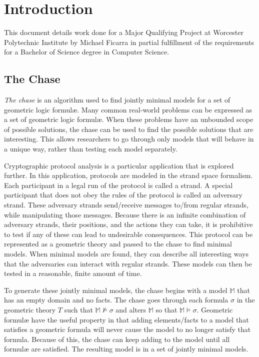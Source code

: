 \section{Introduction}

	This document details work done for a Major Qualifying Project at Worcester
	Polytechnic Institute by Michael Ficarra in partial fulfillment of the
	requirements for a Bachelor of Science degree in Computer Science.

	\subsection{The Chase}

		\emph{The chase} is an algorithm used to find jointly minimal models
		for a set of geometric logic formul{\ae}. Many common real-world
		problems can be expressed as a set of geometric logic formul{\ae}. When
		these problems have an unbounded scope of possible solutions, the chase
		can be used to find the possible solutions that are interesting. This
		allows researchers to go through only models that will behave in a
		unique way, rather than testing each model separately.

		Cryptographic protocol analysis is a particular application that is
		explored further. In this application, protocols are modeled in the
		strand space formalism. Each participant in a legal run of the
		protocol is called a strand. A special participant that does not obey
		the rules of the protocol is called an adversary strand. These
		adversary strands send/receive messages to/from regular strands, while
		manipulating those messages. Because there is an infinite combination
		of adversary strands, their positions, and the actions they can take,
		it is prohibitive to test if any of these can lead to undesirable
		consequences. This protocol can be represented as a geometric theory
		and passed to the chase to find minimal models. When minimal models
		are found, they can describe all interesting ways that the adversaries
		can interact with regular strands. These models can then be tested in
		a reasonable, finite amount of time.

		To generate these jointly minimal models, the chase begins with a model
		$\mathbb{M}$ that has an empty domain and no facts. The chase goes
		through each formula $\sigma$ in the geometric theory $T$ such that
		$\mathbb{M} \not\models \sigma$ and alters $\mathbb{M}$ so that
		$\mathbb{M} \models \sigma$. Geometric formul{\ae} have the useful
		property in that adding elements/facts to a model that satisfies a
		geometric formula will never cause the model to no longer satisfy that
		formula.  Because of this, the chase can keep adding to the model until
		all formul{\ae} are satisfied. The resulting model is in a set of
		jointly minimal models.

